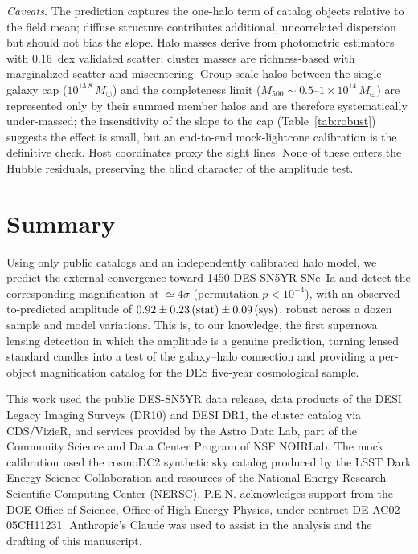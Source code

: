 \documentclass[twocolumn]{aastex701}
\newcommand{\msun}{M_\odot}
\begin{document}
\emph{Caveats.} The prediction captures the one-halo term of catalog
objects relative to the field mean; diffuse structure contributes
additional, uncorrelated dispersion but should not bias the slope. Halo
masses derive from photometric estimators with 0.16~dex validated
scatter; cluster masses are richness-based with marginalized scatter and
miscentering. Group-scale halos between the single-galaxy cap
($10^{13.8}\,\msun$) and the \citet{WenHan2024} completeness limit
($M_{500} \sim 0.5$--$1\times10^{14}\,\msun$) are represented only by
their summed member halos and are therefore systematically under-massed;
the insensitivity of the slope to the cap (Table~\ref{tab:robust})
suggests the effect is small, but an end-to-end mock-lightcone
calibration is the definitive check. Host coordinates proxy the sight
lines. None of these enters the Hubble residuals, preserving the blind
character of the amplitude test.

\section{Summary}

Using only public catalogs and an independently calibrated halo model, we
predict the external convergence toward 1450 DES-SN5YR SNe~Ia and detect
the corresponding magnification at $\simeq 4\sigma$ (permutation
$p < 10^{-4}$), with an observed-to-predicted amplitude of
$0.92 \pm 0.23\,{\rm (stat)} \pm 0.09\,{\rm (sys)}$, robust across a
dozen sample and model variations. This is, to our knowledge, the first
supernova lensing detection in which the amplitude is a genuine
prediction, turning lensed standard candles into a test of the
galaxy--halo connection and providing a per-object magnification catalog
for the DES five-year cosmological sample.

\begin{acknowledgments}
This work used the public DES-SN5YR data release, data products of the
DESI Legacy Imaging Surveys (DR10) and DESI DR1, the \citet{WenHan2024}
cluster catalog via CDS/VizieR, and services provided by the Astro Data
Lab, part of the Community Science and Data Center Program of NSF
NOIRLab. The mock calibration used the cosmoDC2 synthetic sky catalog
produced by the LSST Dark Energy Science Collaboration
\citep{Korytov2019} and resources of the National Energy Research
Scientific Computing Center (NERSC). P.E.N. acknowledges support from
the DOE Office of Science, Office of High Energy Physics, under
contract DE-AC02-05CH11231.
Anthropic's Claude was used to assist in the analysis and the drafting
of this manuscript.
\end{acknowledgments}
\end{document}

